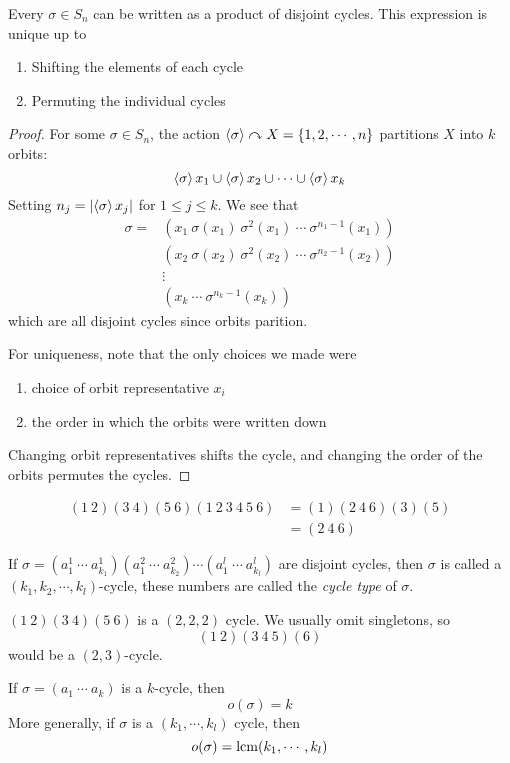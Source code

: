 \documentclass{article}
\begin{document}
\begin{thm}
    Every $\sigma \in S_n$ can be written as a product of disjoint cycles. This expression is unique up to
    \begin{enumerate}
        \item Shifting the elements of each cycle
        \item Permuting the individual cycles
    \end{enumerate}
\end{thm}
\begin{proof}
    For some $\sigma \in S_n$, the action $\left\langle \sigma\right\rangle \curvearrowright X = \{1, 2, \cdots, n \}$ partitions $X$ into $k$ orbits:
    \[
        \left\langle \sigma\right\rangle x_1 \cup \left\langle \sigma\right\rangle x_2 \cup \cdots \cup \left\langle \sigma\right\rangle x_k
    \]
    Setting $n_j = \left\lvert  \left\langle \sigma\right\rangle x_j \right\rvert$ for $1 \leq j \leq k$. We see that
    \begin{align*}
        \sigma = &(x_1 \ \sigma(x_1) \ \sigma^2(x_1) \  \cdots \ \sigma^{n_1 -1}(x_1)) \\
        &(x_2 \ \sigma(x_2) \ \sigma^2(x_2) \ \cdots \ \sigma^{n_2 - 1}(x_2)) \\
        &\vdots \\
        &(x_k \ \cdots \ \sigma^{n_k - 1}(x_k))
    \end{align*}
    which are all disjoint cycles since orbits parition.
    
    For uniqueness, note that the only choices we made were
    \begin{enumerate}
        \item choice of orbit representative $x_i$
        \item the order in which the orbits were written down
    \end{enumerate}
    Changing orbit representatives shifts the cycle, and changing the order of the orbits permutes the cycles.
\end{proof}
\begin{eg}
    \begin{align*}
        (1 \ 2)(3 \ 4)(5 \ 6)(1 \ 2 \ 3 \ 4 \ 5 \ 6) &= (1)(2 \ 4 \ 6)(3)(5) \\
        &= (2 \ 4 \ 6)
    \end{align*}
\end{eg}

\begin{defi}
    If $\sigma = (a^1_1\  \cdots\ a^1_{k_1})(a^2_1\ \cdots\ a^2_{k_2}) \cdots (a^l_1\ \cdots\ a^l_{k_l})$ are disjoint cycles, then $\sigma$ is called a $(k_1, k_2, \cdots, k_l)$-cycle,
    these numbers are called the \emph{cycle type} of $\sigma$. 
\end{defi}
\begin{eg}
    $(1\ 2)(3\ 4)(5\ 6)$ is a $(2, 2, 2)$ cycle. We usually omit singletons, so 
    \[
        (1\ 2)(3\ 4\ 5)(6)  
    \]
    would be a $(2, 3)$-cycle.
\end{eg}
\begin{remark}
    If $\sigma = (a_1\ \cdots\ a_k)$ is a $k$-cycle, then
    \[
        o(\sigma) = k  
    \]
    More generally, if $\sigma$ is a $(k_1, \cdots, k_l)$ cycle, then
    \[
        o(\sigma) = \operatorname{lcm}(k_1, \cdots, k_l)  
    \]
\end{remark}
\end{document}
